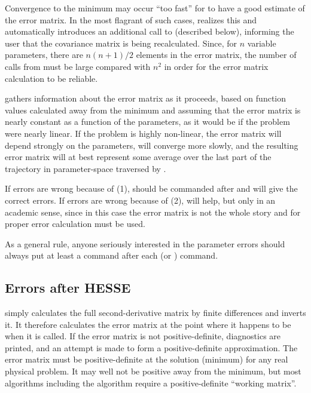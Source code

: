 \begin{OL}
\item Convergence to the minimum may occur ``too fast'' for  to 
      have a good estimate of the error matrix. In the most flagrant of 
      such cases,  realizes this and automatically introduces an 
      additional call to  (described below), informing the user that 
      the covariance matrix is being recalculated. Since, for $n$ variable 
      parameters, there are $n(n+1)/2$ elements in the error matrix, the 
      number of  calls from  must be large compared with 
      $n^2$ in order for the  error matrix calculation to be 
      reliable.
\item {} gathers information about the error matrix as it 
      proceeds, based on function values calculated away from the 
      minimum and assuming that the error matrix is nearly constant as a 
      function of the parameters, as it would be if the problem were 
      nearly linear. If the problem is highly non-linear, the error matrix 
      will depend strongly on the parameters,  will converge more 
      slowly, and the resulting error matrix will at best represent some 
      average over the last part of the trajectory in parameter-space 
      traversed by .
\end{OL}
 
If  errors are wrong because of (1),
 should be commanded after  
and will give the correct errors. If  
errors are wrong because of (2),  will help, but only in an 
academic sense, since in this case the error matrix is not the whole 
story and for proper error calculation  must be used.
 
As a general rule, anyone seriously interested in the parameter 
errors should always put at least a  command after each 
 (or ) command.
 
\subsection{Errors after HESSE}
 
 simply calculates the full second-derivative matrix by finite 
differences and inverts it. It therefore calculates the error matrix 
at the point where it happens to be when it is called. If the error 
matrix is not positive-definite, diagnostics are printed, and an 
attempt is made to form a positive-definite approximation. The 
error matrix must be positive-definite at the solution (minimum) 
for any real physical problem. It may well not be positive away from 
the minimum, but most algorithms including the  algorithm 
require a positive-definite ``working matrix''.
 
